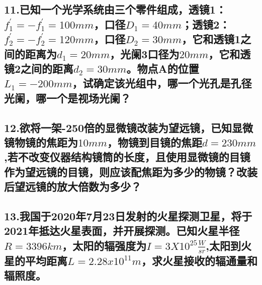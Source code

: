 \documentclass[11pt,a4paper]{article}
\begin{document}
    \subsection*{11.已知一个光学系统由三个零件组成，透镜1：$f_1^{'}=-f_1^{'}=100mm$，口径$D_1=40mm$；透镜2：$f_2^{'}=-f_2^{'}=120mm$，口径$D_2=30mm$，它和透镜1之间的距离为$d_1=20mm$，光阑3口径为$20mm$，它和透镜2之间的距离$d_2=30mm$。物点A的位置$L_1=-200mm$，试确定该光组中，哪一个光孔是孔径光阑，哪一个是视场光阑？}
    \vspace{20mm}
    \subsection*{12.欲将一架-250倍的显微镜改装为望远镜，已知显微镜物镜的焦距为$10mm$，物镜到目镜的焦距$d=230mm$,若不改变仪器结构镜筒的长度，且使用显微镜的目镜作为望远镜的目镜，则应该配焦距为多少的物镜？改装后望远镜的放大倍数为多少？}
    \vspace{20mm}
    \subsection*{13.我国于2020年7月23日发射的火星探测卫星，将于2021年抵达火星表面，并开展探测。已知火星半径$R=3396km$，太阳的辐强度为$I=3X10^{25}\frac{W}{sr}$,太阳到火星的平均距离$L=2.28x10^{11}m$，求火星接收的辐通量和辐照度。}
    \vspace{20mm}
\end{document}
